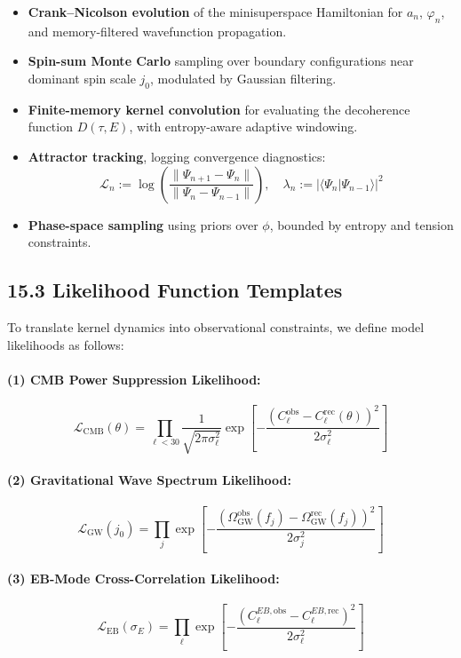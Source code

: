 \begin{itemize}
    \item \textbf{Crank–Nicolson evolution} of the minisuperspace Hamiltonian for \( a_n \), \( \varphi_n \), and memory-filtered wavefunction propagation.
    \item \textbf{Spin-sum Monte Carlo} sampling over boundary configurations near dominant spin scale \( j_0 \), modulated by Gaussian filtering.
    \item \textbf{Finite-memory kernel convolution} for evaluating the decoherence function \( D(\tau, E) \), with entropy-aware adaptive windowing.
    \item \textbf{Attractor tracking}, logging convergence diagnostics:
    \[
    \mathcal{L}_n := \log \left( \frac{\|\Psi_{n+1} - \Psi_n\|}{\|\Psi_n - \Psi_{n-1}\|} \right), \quad \lambda_n := |\langle \Psi_n | \Psi_{n-1} \rangle|^2
    \]
    \item \textbf{Phase-space sampling} using priors over \( \phi \), bounded by entropy and tension constraints.
\end{itemize}

\subsection{15.3 Likelihood Function Templates}

To translate kernel dynamics into observational constraints, we define model likelihoods as follows:

\paragraph{(1) CMB Power Suppression Likelihood:}
\[
\mathcal{L}_{\text{CMB}}(\theta) = \prod_{\ell < 30} \frac{1}{\sqrt{2\pi \sigma_\ell^2}} \exp\left[ -\frac{(C_\ell^{\text{obs}} - C_\ell^{\text{rec}}(\theta))^2}{2\sigma_\ell^2} \right]
\]

\paragraph{(2) Gravitational Wave Spectrum Likelihood:}
\[
\mathcal{L}_{\text{GW}}(j_0) = \prod_j \exp\left[ -\frac{(\Omega_{\text{GW}}^{\text{obs}}(f_j) - \Omega_{\text{GW}}^{\text{rec}}(f_j))^2}{2\sigma_j^2} \right]
\]

\paragraph{(3) EB-Mode Cross-Correlation Likelihood:}
\[
\mathcal{L}_{\text{EB}}(\sigma_E) = \prod_{\ell} \exp\left[ -\frac{(C_\ell^{EB,\text{obs}} - C_\ell^{EB,\text{rec}})^2}{2\sigma_\ell^2} \right]
\]

